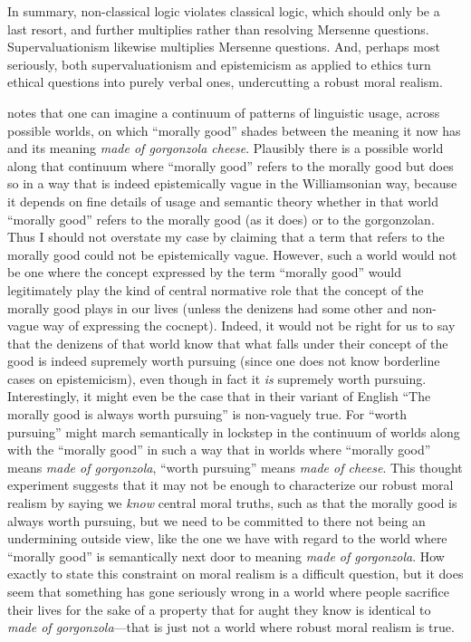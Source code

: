 In summary, non-classical logic violates classical logic, which should only be a last resort, and further multiplies rather than resolving 
Mersenne questions. Supervaluationism likewise multiplies Mersenne questions. And, perhaps most seriously, both supervaluationism and 
epistemicism as applied to ethics turn ethical questions into purely verbal ones, undercutting a robust 
moral realism.

 notes that one can imagine
a continuum of patterns of linguistic usage, across possible worlds, on which ``morally good'' shades between the meaning it now has and its
meaning \textit{made of gorgonzola cheese}. Plausibly there is a possible world along that continuum where
``morally good'' refers to the morally good but does so in a way that is indeed epistemically vague in the Williamsonian way, because it depends on fine details
of usage and semantic theory whether in that world ``morally good'' refers to the morally good (as it does) or 
to the gorgonzolan. 
Thus I should not overstate my case by claiming that a term that refers to the morally good could not be
epistemically vague. However, such a world would not be one where the concept expressed by the term ``morally good'' 
would legitimately play the kind of central normative role that the concept of the morally good plays in our lives
(unless the denizens had some other and non-vague way of expressing the cocnept).
Indeed, it would not be right for us to say that the denizens of that world know that what falls under their 
concept of the good is indeed supremely worth pursuing (since one does not know borderline cases on
epistemicism), even though in fact it \textit{is} supremely worth pursuing. Interestingly, it
might even be the case that in their variant of English ``The morally good is always worth pursuing'' is non-vaguely
true. For ``worth pursuing'' might march semantically in lockstep in the continuum of worlds along with the ``morally 
good'' in such a way that in worlds where ``morally good'' means \textit{made of gorgonzola}, ``worth pursuing''
means \textit{made of cheese}. This thought experiment suggests that it may not be enough to characterize our
robust moral realism by saying we \textit{know} central moral truths, such as that the morally good is always worth
pursuing, but we need to be committed to there not being an undermining outside view, like the one we have with regard
to the world where ``morally good'' is semantically next door to meaning \textit{made of gorgonzola}. How exactly 
to state this constraint on moral realism is a difficult question, but it does seem that something has gone seriously
wrong in a world where people sacrifice their lives for the sake of a property that for aught they know is identical
to \textit{made of gorgonzola}---that is just not a world where robust moral realism is true.

